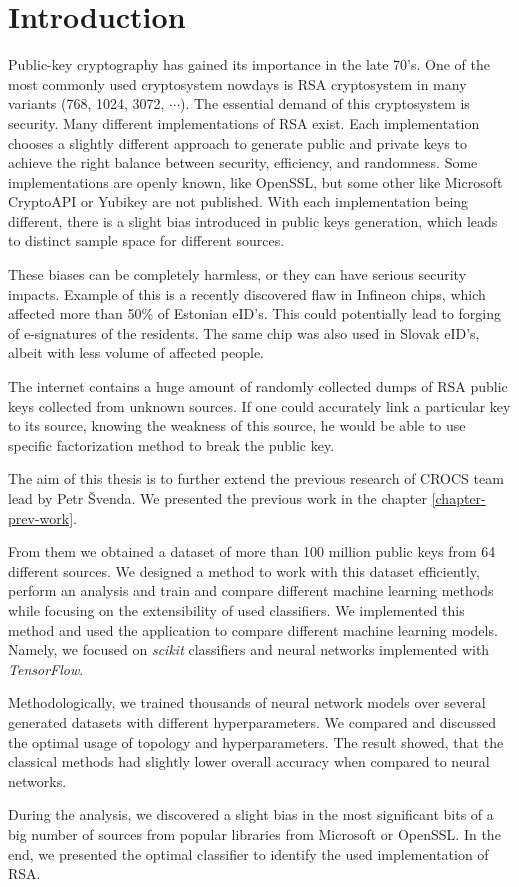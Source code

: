 \chapter*{Introduction}

Public-key cryptography has gained its importance in the late 70's. One of the most commonly used cryptosystem nowdays is RSA cryptosystem in many variants (768, 1024, 3072, $\cdots$). The essential demand of this cryptosystem is security. Many different implementations of RSA exist. Each implementation chooses a slightly different approach to generate public and private keys to achieve the right balance between security, efficiency, and randomness. Some implementations are openly known, like OpenSSL, but some other like Microsoft CryptoAPI or Yubikey are not published. With each implementation being different, there is a slight bias introduced in public keys generation, which leads to distinct sample space for different sources. 

These biases can be completely harmless, or they can have serious security impacts. Example of this is a recently discovered flaw in Infineon chips\cite{svenda_2}, which affected more than 50\% of Estonian eID's. This could potentially lead to forging of e-signatures of the residents. The same chip was also used in Slovak eID's, albeit with less volume of affected people.

The internet contains a huge amount of randomly collected dumps of RSA public keys collected from unknown sources. If one could accurately link a particular key to its source, knowing the weakness of this source, he would be able to use specific factorization method to break the public key.

The aim of this thesis is to further extend the previous research of CROCS team \cite{svenda_1}\cite{svenda_3} lead by Petr Švenda. We presented the previous work in the chapter \ref{chapter-prev-work}. 

From them we obtained a dataset of more than 100 million public keys from 64 different sources. We designed a method to work with this dataset efficiently, perform an analysis and train and compare different machine learning methods while focusing on the extensibility of used classifiers. We implemented this method and used the application to compare different machine learning models. Namely, we focused on \textit{scikit} classifiers and neural networks implemented with \textit{TensorFlow}. 

Methodologically, we trained thousands of neural network models over several generated datasets with different hyperparameters. We compared and discussed the optimal usage of topology and hyperparameters. The result showed, that the classical methods had slightly lower overall accuracy when compared to neural networks. 

During the analysis, we discovered a slight bias in the most significant bits of a big number of sources from popular libraries from Microsoft or OpenSSL. In the end, we presented the optimal classifier to identify the used implementation of RSA.

